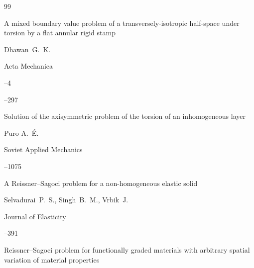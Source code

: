 \begin{thebibliography}{99}





\paper A mixed boundary value problem of a transversely-isotropic half-space under torsion by a flat annular rigid stamp

\by Dhawan~G.~K. 

\jour Acta Mechanica 



--4 

--297






\paper Solution of the axisymmetric problem of the torsion of an inhomogeneous layer 

\by Puro A.~\'E.

\jour Soviet Applied Mechanics 




--1075






\paper A Reissner--Sagoci problem for a non-homogeneous elastic solid 

\by Selvadurai~P.~S., Singh~B.~M., Vrbik~J. 

\jour Journal of Elasticity 




--391






\paper Reissner--Sagoci problem for functionally graded materials with arbitrary spatial variation of material properties 


\end{thebibliography}
